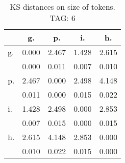 \begin{table}[h!]
\begin{center}
\begin{tabular}{| l | c | c | c | c |}\hline
 & g. & p. & i. & h. \\\hline
g. & 0.000  & 2.467  & 1.428  & 2.615 \\\hline
 & 0.000  & 0.011  & 0.007  & 0.010 \\\hline
p. & 2.467  & 0.000  & 2.498  & 4.148 \\\hline
 & 0.011  & 0.000  & 0.015  & 0.022 \\\hline
i. & 1.428  & 2.498  & 0.000  & 2.853 \\\hline
 & 0.007  & 0.015  & 0.000  & 0.015 \\\hline
h. & 2.615  & 4.148  & 2.853  & 0.000 \\\hline
 & 0.010  & 0.022  & 0.015  & 0.000 \\\hline
\end{tabular}
\caption{KS distances on size of tokens. TAG: 6}
\end{center}
\end{table}